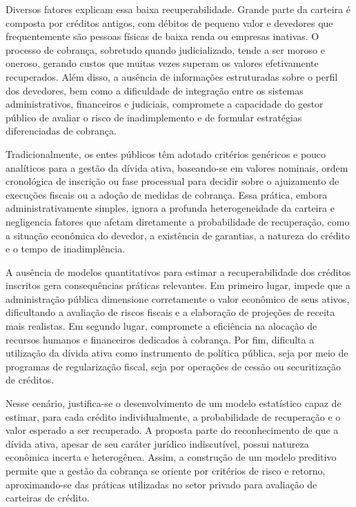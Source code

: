 \documentclass[a4paper,12pt]{article}
\begin{document}
Diversos fatores explicam essa baixa recuperabilidade. Grande parte da carteira é composta por créditos antigos, com débitos de pequeno valor e devedores que frequentemente são pessoas físicas de baixa renda ou empresas inativas. O processo de cobrança, sobretudo quando judicializado, tende a ser moroso e oneroso, gerando custos que muitas vezes superam os valores efetivamente recuperados. Além disso, a ausência de informações estruturadas sobre o perfil dos devedores, bem como a dificuldade de integração entre os sistemas administrativos, financeiros e judiciais, compromete a capacidade do gestor público de avaliar o risco de inadimplemento e de formular estratégias diferenciadas de cobrança.

Tradicionalmente, os entes públicos têm adotado critérios genéricos e pouco analíticos para a gestão da dívida ativa, baseando-se em valores nominais, ordem cronológica de inscrição ou fase processual para decidir sobre o ajuizamento de execuções fiscais ou a adoção de medidas de cobrança. Essa prática, embora administrativamente simples, ignora a profunda heterogeneidade da carteira e negligencia fatores que afetam diretamente a probabilidade de recuperação, como a situação econômica do devedor, a existência de garantias, a natureza do crédito e o tempo de inadimplência.

A ausência de modelos quantitativos para estimar a recuperabilidade dos créditos inscritos gera consequências práticas relevantes. Em primeiro lugar, impede que a administração pública dimensione corretamente o valor econômico de seus ativos, dificultando a avaliação de riscos fiscais e a elaboração de projeções de receita mais realistas. Em segundo lugar, compromete a eficiência na alocação de recursos humanos e financeiros dedicados à cobrança. Por fim, dificulta a utilização da dívida ativa como instrumento de política pública, seja por meio de programas de regularização fiscal, seja por operações de cessão ou securitização de créditos.

Nesse cenário, justifica-se o desenvolvimento de um modelo estatístico capaz de estimar, para cada crédito individualmente, a probabilidade de recuperação e o valor esperado a ser recuperado. A proposta parte do reconhecimento de que a dívida ativa, apesar de seu caráter jurídico indiscutível, possui natureza econômica incerta e heterogênea. Assim, a construção de um modelo preditivo permite que a gestão da cobrança se oriente por critérios de risco e retorno, aproximando-se das práticas utilizadas no setor privado para avaliação de carteiras de crédito.
\end{document}
